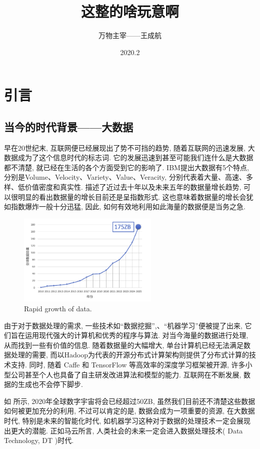 \documentclass[lang=cn,11pt,a4paper]{elegantpaper}
\title{这整的啥玩意啊}
\author{万物主宰——王成航}
\date{2020.2}
\begin{document}
\tableofcontents
\thispagestyle{empty}
\newpage
{}
\section{引言}
\subsection{当今的时代背景——大数据}
\par 早在20世纪末, 互联网便已经展现出了势不可挡的趋势, 随着互联网的迅速发展, 大数据成为了这个信息时代的标志词. 它的发展迅速到甚至可能我们连什么是大数据都不清楚, 就已经在生活的各个方面受到它的影响了. IBM提出大数据有5个特点, 分别是Volume、Velocity、Variety、Value、Veracity, 分别代表着大量、高速、多样、低价值密度和真实性.  描述了近过去十年以及未来五年的数据量增长趋势, 可以很明显的看出数据量的增长目前还是呈指数形式. 这也意味着数据量的增长会犹如指数爆炸一般十分迅猛, 因此, 如何有效地利用如此海量的数据便是当务之急. 
\begin{figure}[htbp]
	\centering
	\includegraphics[width=0.6\textwidth]{Bigdata}
  	\caption{Rapid growth of data.\label{fig:data}}
\end{figure}
\par 由于对于数据处理的需求, 一些技术如“数据挖掘”,、“机器学习”便被提了出来, 它们旨在运用现代强大的计算机和优秀的程序与算法. 对当今海量的数据进行处理, 从而找到一些有价值的信息. 随着数据量的大幅增大, 单台计算机已经无法满足数据处理的需要, 而以Hadoop为代表的开源分布式计算架构则提供了分布式计算的技术支持. 同时, 随着 Caffe 和 TensorFlow 等高效率的深度学习框架被开源, 许多小型公司甚至个人也具备了自主研发改进算法和模型的能力. 互联网在不断发展, 数据的生成也不会停下脚步. 
\par 如 所示, 2020年全球数字宇宙将会已经超过50ZB, 虽然我们目前还不清楚这些数据如何被更加充分的利用, 不过可以肯定的是, 数据会成为一项重要的资源, 在大数据时代, 特别是未来的智能化时代, 如机器学习这种对于数据的处理技术一定会展现出更大的潜能. 正如马云所言, 人类社会的未来一定会进入数据处理技术( Data Technology, DT )时代.
\end{document}
